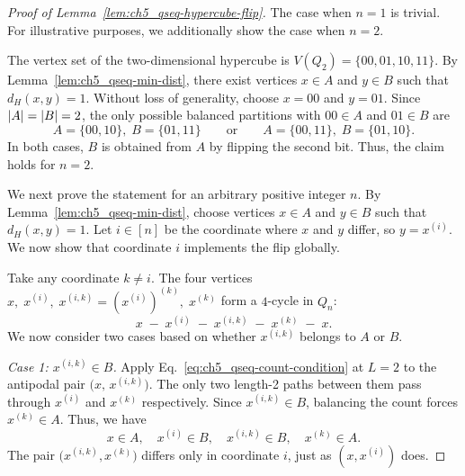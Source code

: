 \begin{proof}[Proof of Lemma~\ref{lem:ch5_qseq-hypercube-flip}]
    The case when $n = 1$ is trivial.
    For illustrative purposes, we additionally show the case when $n = 2$.

    The vertex set of the two-dimensional hypercube is $V(Q_2) = \{00, 01, 10, 11\}$.
    By Lemma~\ref{lem:ch5_qseq-min-dist}, there exist vertices $x \in A$ and $y \in B$ such that $d_H(x, y) = 1$.
    Without loss of generality, choose $x = 00$ and $y = 01$.
    Since $\abs{A} = \abs{B} = 2$, the only possible balanced partitions with $00 \in A$ and $01 \in B$ are
    \begin{equation}
        A = \{00, 10\}, \; B = \{01, 11\} \qquad \text{or} \qquad A = \{00, 11\}, \; B = \{01, 10\}.
    \end{equation}
    In both cases, $B$ is obtained from $A$ by flipping the second bit.
    Thus, the claim holds for $n = 2$.

    \medskip

    We next prove the statement for an arbitrary positive integer $n$.
    By Lemma~\ref{lem:ch5_qseq-min-dist}, choose vertices $x \in A$ and $y \in B$ such that $d_H(x, y) = 1$.
    Let $i \in [n]$ be the coordinate where $x$ and $y$ differ, so $y = x^{(i)}$.
    We now show that coordinate $i$ implements the flip globally.

    \medskip
    \noindent Take any coordinate $k \neq i$.
    The four vertices $x, \; x^{(i)}, \; x^{(i,k)} = (x^{(i)})^{(k)}, \; x^{(k)}$ form a $4$-cycle in $Q_n$:
    \begin{equation}
        x \;-\; x^{(i)} \;-\; x^{(i,k)} \;-\; x^{(k)} \;-\; x.
    \end{equation}
    We now consider two cases based on whether $x^{(i,k)}$ belongs to $A$ or $B$.

    \medskip
    \noindent\textit{Case 1: $x^{(i,k)} \in B$.} Apply Eq.~\eqref{eq:ch5_qseq-count-condition} at $L = 2$ to the antipodal pair $\bigl(x, \, x^{(i,k)}\bigr)$.
    The only two length-2 paths between them pass through $x^{(i)}$ and $x^{(k)}$ respectively.
    Since $x^{(i,k)} \in B$, balancing the count forces $x^{(k)} \in A$.
    Thus, we have
    \begin{equation}
        x \in A, \quad x^{(i)} \in B, \quad x^{(i,k)} \in B, \quad x^{(k)} \in A.
    \end{equation}
    The pair $\bigl(x^{(i,k)}, x^{(k)}\bigr)$ differs only in coordinate $i$, just as $(x, x^{(i)})$ does.


\end{proof}
